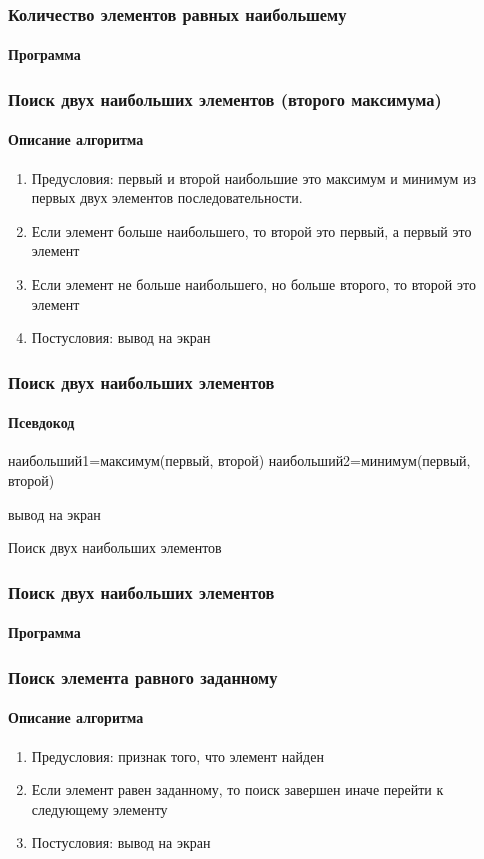 \begin{frame}[fragile]
\frametitle{Количество элементов равных наибольшему}
\framesubtitle{Программа}


\end{frame}

\begin{frame}[fragile]
\frametitle{Поиск двух наибольших элементов (второго максимума)}
\framesubtitle{Описание алгоритма}

\begin{enumerate}
	\item Предусловия: первый и второй наибольшие это максимум и минимум из первых двух элементов последовательности.
	\item Если элемент больше наибольшего, то второй это первый, а первый это элемент
	\item Если элемент не больше наибольшего, но больше второго, то второй это элемент
	\item Постусловия: вывод на экран
	
\end{enumerate}

\end{frame}

\begin{frame}[fragile]
\frametitle{Поиск двух наибольших элементов}
\framesubtitle{Псевдокод}
\small
\begin{algorithm}[H]
		\SetAlgoLined
		наибольший1=максимум(первый, второй)\;
		наибольший2=минимум(первый, второй)\;
	
	вывод на экран\;
	\caption{Поиск двух наибольших элементов}
\end{algorithm}


\end{frame}


\begin{frame}[fragile]
\frametitle{Поиск двух наибольших элементов}
\framesubtitle{Программа}
\small{

}
\end{frame}


\begin{frame}[fragile]
\frametitle{Поиск элемента равного заданному}
\framesubtitle{Описание алгоритма}

\begin{enumerate}
	\item Предусловия: признак того, что элемент найден
	\item Если элемент равен заданному, то поиск завершен иначе перейти к следующему элементу
	\item Постусловия: вывод на экран
	
\end{enumerate}

\end{frame}

